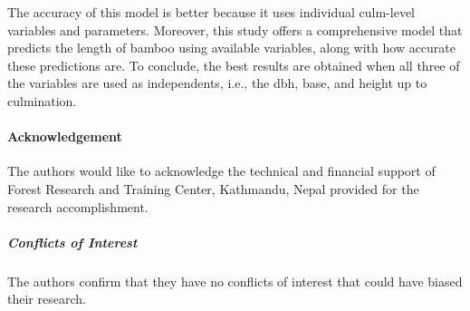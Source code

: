 \documentclass[preprint, 3p,
authoryear]{elsarticle} %
\begin{document}
The accuracy of this model is better because it uses individual
culm-level variables and parameters. Moreover, this study offers a
comprehensive model that predicts the length of bamboo using available
variables, along with how accurate these predictions are. To conclude,
the best results are obtained when all three of the variables are used
as independents, i.e., the dbh, base, and height up to culmination.

\hypertarget{acknowledgement}{%
\paragraph{Acknowledgement}\label{acknowledgement}}

The authors would like to acknowledge the technical and financial
support of Forest Research and Training Center, Kathmandu, Nepal
provided for the research accomplishment.

\hypertarget{conflicts-of-interest}{%
\subparagraph{Conflicts of Interest}\label{conflicts-of-interest}}

The authors confirm that they have no conflicts of interest that could
have biased their research.


\end{document}
